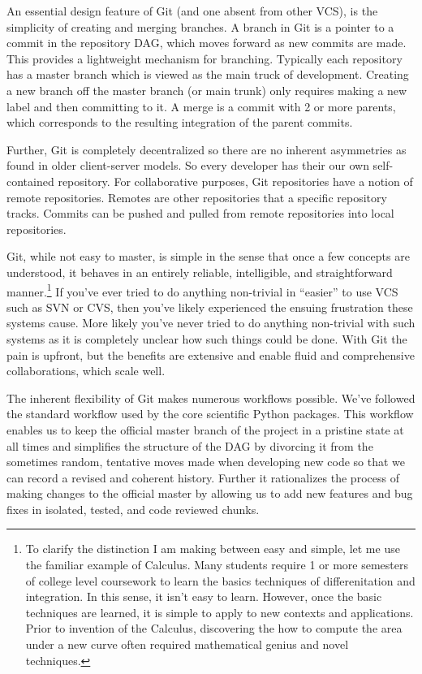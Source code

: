 An essential design feature of Git (and one absent from other VCS), is
the simplicity of creating and merging branches.  A branch in Git is a pointer
to a commit in the repository DAG, which moves forward as new commits are made.
This provides a lightweight mechanism for branching.  Typically each repository
has a master branch which is viewed as the main truck of development.  Creating
a new branch off the master branch (or main trunk) only requires making a new
label and then committing to it.  A merge is a commit with 2 or more parents,
which corresponds to the resulting integration of the parent commits.

Further, Git is completely decentralized so there are no inherent
asymmetries as found in older client-server models.  So every developer
has their our own self-contained repository.  For collaborative purposes,
Git repositories have a notion of remote repositories.  Remotes are other
repositories that a specific repository tracks.  Commits can be pushed
and pulled from remote repositories into local repositories.

Git, while not easy to master, is simple in the sense that once a few concepts
are understood, it behaves in an entirely reliable, intelligible, and
straightforward manner.\footnote{To clarify the distinction I am making between
easy and simple, let me use the familiar example of Calculus.  Many students
require 1 or more semesters of college level coursework to learn the basics
techniques of differenitation and integration.  In this sense, it isn't easy to
learn.  However, once the basic techniques are learned, it is simple to apply
to new contexts and applications.  Prior to invention of the Calculus,
discovering the how to compute the area under a new curve often required
mathematical genius and novel techniques.} If you've ever tried to do anything
non-trivial in ``easier'' to use VCS such as SVN or CVS, then you've likely
experienced the ensuing frustration these systems cause.  More likely you've
never tried to do anything non-trivial with such systems as it is completely
unclear how such things could be done.  With Git the pain is upfront, but the
benefits are extensive and enable fluid and comprehensive collaborations,
which scale well.

The inherent flexibility of Git makes numerous workflows possible.  We've
followed the standard workflow used by the core scientific Python packages.
This workflow enables us to keep the official master branch of the project in a
pristine state at all times and simplifies the structure of the DAG by
divorcing it from the sometimes random, tentative moves made when developing
new code so that we can record a revised and coherent history.  Further it
rationalizes the process of making changes to the official master by allowing
us to add new features and bug fixes in isolated, tested, and code reviewed
chunks.

